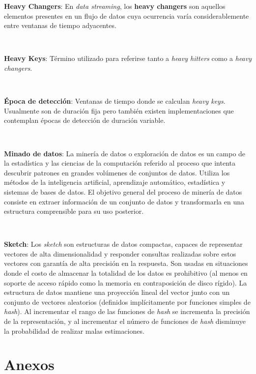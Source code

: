 \documentclass[a4paper,12pt, oneside]{article}
\begin{document}
\textbf{Heavy Changers}: En \textit{data streaming}, los \textbf{heavy changers} son aquellos elementos presentes en un flujo de datos cuya ocurrencia varía considerablemente entre ventanas de tiempo adyacentes. 

\

\textbf{Heavy Keys}: Término utilizado para referirse tanto a \textit{heavy hitters} como a \textit{heavy changers}.

\

\textbf{Época de detección}: Ventanas de tiempo donde se calculan \textit{heavy keys}. Usualmente son de duración fija pero también existen implementaciones que contemplan épocas de detección de duración variable.

\

\textbf{Minado de datos}: La minería de datos o exploración de datos es un campo de la estadística y las ciencias de la computación referido al proceso que intenta descubrir patrones en grandes volúmenes de conjuntos de datos. Utiliza los métodos de la inteligencia artificial, aprendizaje automático, estadística y sistemas de bases de datos. El objetivo general del proceso de minería de datos consiste en extraer información de un conjunto de datos y transformarla en una estructura comprensible para su uso posterior.

\

\textbf{Sketch}: Los \textit{sketch} son estructuras de datos compactas, capaces de representar vectores de alta dimensionalidad y responder consultas realizadas sobre estos vectores con garantía de alta precisión en la respuesta\cite{Cormode:2005:IDS:1073713.1073718}. Son usadas en situaciones donde el costo de almacenar la totalidad de los datos es prohibitivo (al menos en soporte de acceso rápido como la memoria en contraposición de disco rígido). La estructura de datos mantiene una proyección lineal del vector junto con un conjunto de vectores aleatorios (definidos implícitamente por funciones simples de \textit{hash}). Al incrementar el rango de las funciones de \textit{hash} se incrementa la precisión de la representación, y al incrementar el número de funciones de \textit{hash} disminuye la probabilidad de realizar malas estimaciones.

\clearpage

\section{Anexos}
\end{document}
